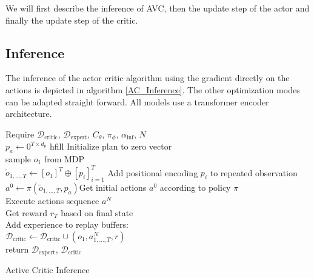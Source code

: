 We will first describe the inference of AVC, then the update step of the actor and finally the update step of the critic.

\subsection{Inference}
The inference of the actor critic algorithm using the gradient directly on the actions is depicted in algorithm \ref{AC_Inference}. 
The other optimization modes can be adapted straight forward. All models use a transformer encoder architecture. \\


\begin{algorithm}[H]
    Require $\mathcal{D}_{\text{critic}}$, $\mathcal{D}_{\text{expert}}$,  
    $C_{\theta}$, $\pi_{\phi}$, $\alpha_{\mathrm{inf}}$, $N$\\
    $p_a \gets 0^{T \times d_p}$ hfill \hfill Initialize plan to zero vector \\
    sample $o_1$ from MDP\\
    $\tilde{o}_{1, ..., T} \gets [o_1]^T \oplus [p_i]_{i=1}^T$ \hfill Add positional encoding $p_i$ to repeated observation \\
    $a^0 \gets \pi(\tilde{o}_{1, ..., T}, p_a)$\hfill Get initial actions $a^0$ according to policy $\pi$ \\
    Execute actions sequence $a^N$\\
    Get reward $r_T$ based on final state\\
    Add experience to replay buffers:\\
    $\mathcal{D}_{\text{critic}} \gets \mathcal{D}_{\text{critic}} \cup (o_1, a^N_{1, ..., T}, r)$\\
    return $\mathcal{D}_{\text{expert}}$, $\mathcal{D}_{\text{critic}}$
    \caption{Active Critic Inference}
    \label{AC_Inference}

\end{algorithm}


